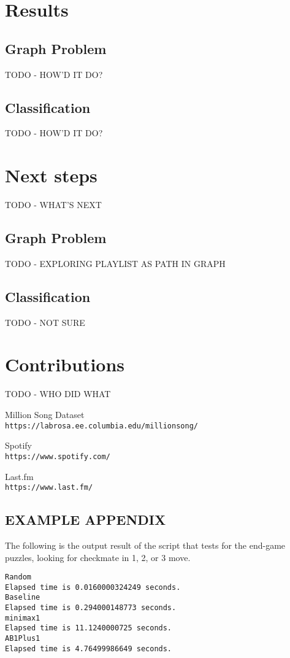 \documentclass[10pt,journal,compsoc]{IEEEtran}
\begin{document}
\section{Results}

\subsection{Graph Problem}
TODO - HOW'D IT DO?

\subsection{Classification}
TODO - HOW'D IT DO?

\section{Next steps}
TODO - WHAT'S NEXT

\subsection{Graph Problem}
TODO - EXPLORING PLAYLIST AS PATH IN GRAPH

\subsection{Classification}
TODO - NOT SURE

\section{Contributions}
TODO - WHO DID WHAT

\begin{thebibliography}{9}

Million Song Dataset \\
\texttt{https://labrosa.ee.columbia.edu/millionsong/}

Spotify \\
\texttt{https://www.spotify.com/}

Last.fm \\
\texttt{https://www.last.fm/}

\end{thebibliography}

\begin{appendices}
\section{EXAMPLE APPENDIX}
The following is the output result of the script that tests for the end-game puzzles, looking for checkmate in 1, 2, or 3 move. \\

\lstset{
basicstyle=\small\ttfamily,
columns=flexible,
breaklines=true
}
\begin{lstlisting}
Random
Elapsed time is 0.0160000324249 seconds.
Baseline
Elapsed time is 0.294000148773 seconds.
minimax1
Elapsed time is 11.1240000725 seconds.
AB1Plus1
Elapsed time is 4.76499986649 seconds.
\end{lstlisting}
\end{appendices}

\end{document}
